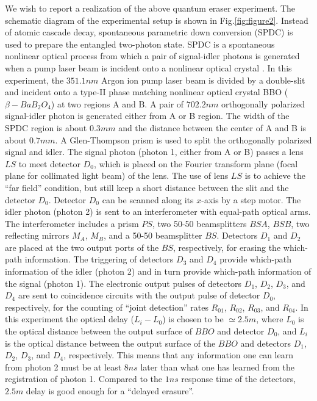 We wish to report a realization of the above quantum eraser experiment. The schematic
diagram of the experimental setup is shown in Fig.\ref{fig:figure2}. Instead of atomic
cascade decay, spontaneous parametric down conversion (SPDC) is used to prepare the
entangled two-photon state. SPDC is a spontaneous nonlinear optical process from which a
pair of signal-idler photons is generated when a pump laser beam is incident onto a
nonlinear optical crystal \cite{SPDC}. In this experiment, the $351.1nm$ Argon ion pump
laser beam is divided by a double-slit and incident onto a type-II phase matching
\cite{typeII} nonlinear optical crystal BBO ($\beta-BaB_{2}O_{4}$) at two regions A and
B. A pair of $702.2nm$ orthogonally polarized signal-idler photon is generated either
from A or B region. The width of the SPDC region is about $0.3mm$ and the distance
between the center of A and B is about $0.7mm$. A Glen-Thompson prism is used to split
the orthogonally polarized signal and idler. The signal photon (photon 1, either from A
or B) passes a lens $LS$ to meet detector $D_{0}$, which is placed on the Fourier
transform plane (focal plane for collimated light beam) of the lens. The use of lens $LS$
is to achieve the ``far field'' condition, but still keep a short distance between the
slit and the detector $D_{0}$. Detector $D_{0}$ can be scanned along its $x$-axis by a
step motor. The idler photon (photon 2) is sent to an interferometer with equal-path
optical arms. The interferometer includes a prism $PS$, two 50-50 beamsplitters $BSA$,
$BSB$, two reflecting mirrors $M_{A}$, $M_{B}$, and a 50-50 beamsplitter $BS$. Detectors
$D_{1}$ and $D_{2}$ are placed at the two output ports of the $BS$, respectively, for
erasing the which-path information. The triggering of detectors $D_{3}$ and $D_{4}$
provide which-path information of the idler (photon 2) and in turn provide which-path
information of the signal (photon 1). The electronic output pulses of detectors $D_{1}$,
$D_{2}$, $D_{3}$, and $D_{4}$ are sent to coincidence circuits with the output pulse of
detector $D_{0}$,
respectively, for the counting of ``joint detection'' rates $R_{01}$, $%
R_{02} $, $R_{03}$, and $R_{04}$. In this experiment the optical delay ($%
L_{i}-L_{0} $) is chosen to be $\simeq 2.5m$, where $L_{0}$ is the
optical
distance between the output surface of $BBO$ and detector $D_{0}$, and $%
L_{i} $ is the optical distance between the output surface of the $BBO$ and detectors
$D_{1} $, $D_{2}$, $D_{3}$, and $D_{4}$, respectively. This means that any information
one can learn from photon 2 must be at least $8ns$ later
than what one has learned from the registration of photon 1. Compared to the $%
1ns$ response time of the detectors, $2.5m$ delay is good enough
for a ``delayed erasure''.

